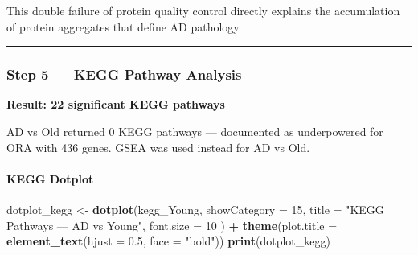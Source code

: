 \documentclass[
]{article}
\newenvironment{Shaded}{\begin{snugshade}}{\end{snugshade}}
\newcommand{\AttributeTok}[1]{\textcolor[rgb]{0.13,0.29,0.53}{#1}}
\newcommand{\DecValTok}[1]{\textcolor[rgb]{0.00,0.00,0.81}{#1}}
\newcommand{\FloatTok}[1]{\textcolor[rgb]{0.00,0.00,0.81}{#1}}
\newcommand{\FunctionTok}[1]{\textcolor[rgb]{0.13,0.29,0.53}{\textbf{#1}}}
\newcommand{\NormalTok}[1]{#1}
\newcommand{\OtherTok}[1]{\textcolor[rgb]{0.56,0.35,0.01}{#1}}
\newcommand{\SpecialCharTok}[1]{\textcolor[rgb]{0.81,0.36,0.00}{\textbf{#1}}}
\newcommand{\StringTok}[1]{\textcolor[rgb]{0.31,0.60,0.02}{#1}}
\begin{document}
This double failure of protein quality control directly explains the
accumulation of protein aggregates that define AD pathology.

\begin{center}\rule{0.5\linewidth}{0.5pt}\end{center}

\subsubsection{Step 5 --- KEGG Pathway
Analysis}\label{step-5-kegg-pathway-analysis}

\begin{Shaded}
\end{Shaded}

\textbf{Result: 22 significant KEGG pathways}

AD vs Old returned 0 KEGG pathways --- documented as underpowered for
ORA with 436 genes. GSEA was used instead for AD vs Old.

\paragraph{KEGG Dotplot}\label{kegg-dotplot}

\begin{Shaded}
\begin{Highlighting}[]
\NormalTok{dotplot\_kegg }\OtherTok{\textless{}{-}} \FunctionTok{dotplot}\NormalTok{(kegg\_Young,}
    \AttributeTok{showCategory =} \DecValTok{15}\NormalTok{,}
    \AttributeTok{title =} \StringTok{"KEGG Pathways — AD vs Young"}\NormalTok{,}
    \AttributeTok{font.size =} \DecValTok{10}
\NormalTok{) }\SpecialCharTok{+}
    \FunctionTok{theme}\NormalTok{(}\AttributeTok{plot.title =} \FunctionTok{element\_text}\NormalTok{(}\AttributeTok{hjust =} \FloatTok{0.5}\NormalTok{, }\AttributeTok{face =} \StringTok{"bold"}\NormalTok{))}
\FunctionTok{print}\NormalTok{(dotplot\_kegg)}
\end{Highlighting}
\end{Shaded}
\end{document}
